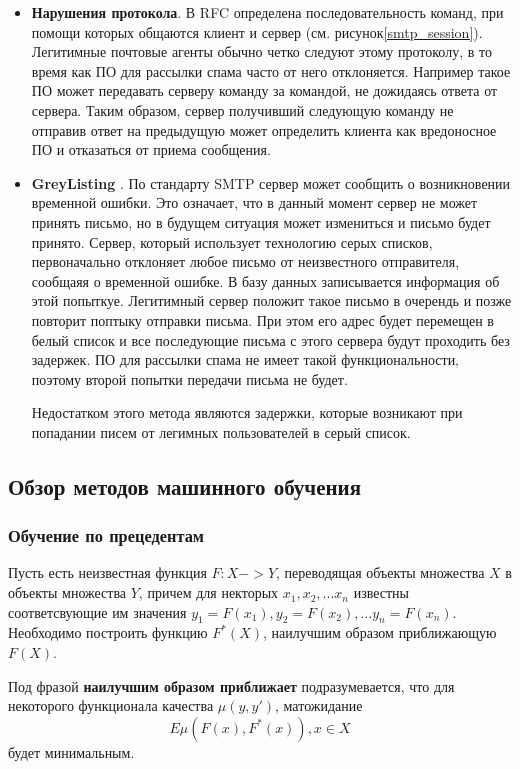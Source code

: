 \begin{itemize}
	\item \textbf{Нарушения протокола}. В RFC\cite{RFC2081} определена последовательность команд, при помощи которых общаются клиент и сервер (см. рисунок\ref{smtp_session}). Легитимные почтовые агенты обычно четко следуют этому протоколу, в то время как ПО для рассылки спама часто от него отклоняется. Например такое ПО может передавать серверу команду за командой, не дожидаясь ответа от сервера. Таким образом, сервер получивший следующую команду не отправив ответ на предыдущую  может определить клиента как вредоносное ПО и отказаться от приема сообщения.
	\item \textbf{GreyListing} \cite{GREYLISTING}. По стандарту SMTP \cite{RFC2081} сервер может сообщить о возникновении временной ошибки. Это означает, что в данный момент сервер не может принять письмо, но в будущем ситуация может измениться и письмо будет принято. Сервер, который использует технологию серых списков, первоначально отклоняет любое письмо от неизвестного отправителя, сообщаяя о временной ошибке. В базу данных записывается информация об этой попыткуе. Легитимный сервер положит такое письмо в очерендь и позже повторит поптыку отправки письма. При этом его адрес будет перемещен в белый список и все последующие письма с этого сервера будут проходить без задержек. ПО для рассылки спама не имеет такой функциональности, поэтому второй попытки передачи письма не будет.
	
Недостатком этого метода являются задержки, которые возникают при попадании писем от легимных пользователей в серый список.
\end{itemize}

\subsection{Обзор методов машинного обучения} 
\subsubsection{Обучение по прецедентам}
Пусть есть неизвестная функция $F: X -> Y$, переводящая объекты
множества $X$ в объекты множества $Y$, причем для некторых $x_1, x_2, ... x_n$ известны соответсвующие им значения $y_1 = F(x_1), y_2 = F(x_2), ... y_n = F(x_n)$.
Необходимо построить функцию $F^*(X)$, наилучшим образом приближающую $F(X)$.

Под фразой \textbf{наилучшим образом приближает} подразумевается, что для некоторого функционала качества $\mu(y, y')$, матожидание
\begin{equation}
\label{}
E\mu(F(x), F^*(x)), x \in X
\end{equation}
будет минимальным.

